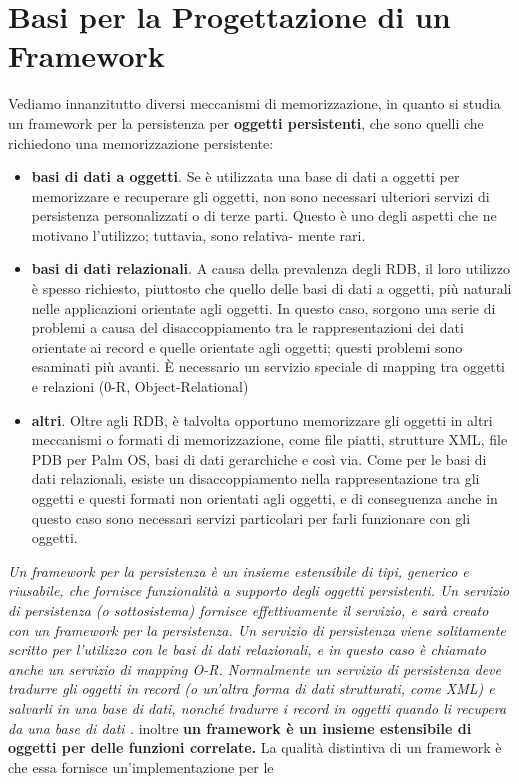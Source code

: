 \documentclass[a4paper,12pt, oneside]{book}
\begin{document}
\section{Basi per la Progettazione di un Framework}
Vediamo innanzitutto diversi meccanismi di memorizzazione, in quanto si studia un framework per la persistenza per \textbf{oggetti persistenti}, che sono quelli che richiedono una
memorizzazione persistente:
\begin{itemize}
\item \textbf{basi di dati a oggetti}. Se è utilizzata una base di dati a oggetti per memorizzare e recuperare gli oggetti, non sono necessari ulteriori servizi di persistenza personalizzati o di
terze parti. Questo è uno degli aspetti che ne motivano l'utilizzo; tuttavia, sono relativa-
mente rari.
\item \textbf{basi di dati relazionali}. A causa della prevalenza degli RDB, il loro utilizzo è spesso
richiesto, piuttosto che quello delle basi di dati a oggetti, più naturali nelle applicazioni
orientate agli oggetti. In questo caso, sorgono una serie di problemi a causa del disaccoppiamento tra le rappresentazioni dei dati orientate ai record e quelle orientate agli
oggetti; questi problemi sono esaminati più avanti. È necessario un servizio speciale di
mapping tra oggetti e relazioni (0-R, Object-Relational)
\item \textbf{altri}. Oltre agli RDB, è talvolta opportuno memorizzare gli oggetti in altri meccanismi
o formati di memorizzazione, come file piatti, strutture XML, file PDB per Palm OS,
basi di dati gerarchiche e così via. Come per le basi di dati relazionali, esiste un disaccoppiamento nella rappresentazione tra gli oggetti e questi formati non orientati agli
oggetti, e di conseguenza anche in questo caso sono necessari servizi particolari per farli
funzionare con gli oggetti.
\end{itemize}
\textit{Un framework per la persistenza è un insieme estensibile di tipi, generico e riusabile,
che fornisce funzionalità a supporto degli oggetti persistenti. Un servizio di persistenza
(o sottosistema) fornisce effettivamente il servizio, e sarà creato con un framework per la
persistenza. Un servizio di persistenza viene solitamente scritto per l'utilizzo con le basi
di dati relazionali, e in questo caso è chiamato anche un servizio di mapping O-R. Normalmente un servizio di persistenza deve tradurre gli oggetti in record (o un'altra forma
di dati strutturati, come XML) e salvarli in una base di dati, nonché tradurre i record in
oggetti quando li recupera da una base di dati .} inoltre \textbf{un framework è un insieme estensibile di oggetti per delle funzioni correlate.} La qualità distintiva di un framework è che essa fornisce un'implementazione per le
\end{document}
